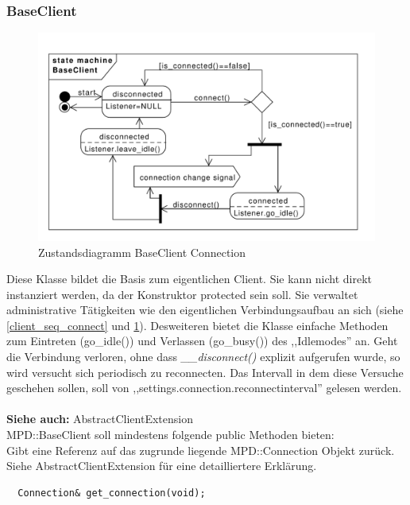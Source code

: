 \subsubsection{BaseClient}

\begin{figure}[htb!]
	\centering
        \includegraphics[width=\textwidth]{./gfx/state/baseclient}
	\caption{Zustandsdiagramm BaseClient Connection}
	\label{st_base_client}
\end{figure}

Diese Klasse bildet die Basis zum eigentlichen Client. Sie kann nicht direkt instanziert werden, da
der Konstruktor protected sein soll.
Sie verwaltet administrative Tätigkeiten wie den eigentlichen Verbindungsaufbau an sich (siehe \ref{client_seq_connect} und \ref{st_base_client}). 
Desweiteren bietet die Klasse einfache Methoden zum Eintreten (go\_idle()) und Verlassen (go\_busy()) des ,,Idlemodes'' an.
Geht die Verbindung verloren, ohne dass \emph{\_\_disconnect()} explizit aufgerufen wurde, so wird versucht sich periodisch zu reconnecten.
Das Intervall in dem diese Versuche geschehen sollen, soll von ,,settings.connection.reconnectinterval'' gelesen werden.
\\
\\
\textbf{Siehe auch:} AbstractClientExtension
\\
MPD::BaseClient soll mindestens folgende public Methoden bieten:
\\
Gibt eine Referenz auf das zugrunde liegende MPD::Connection Objekt zurück. 
Siehe AbstractClientExtension für eine detailliertere Erklärung.
\\
\begin{verbatim}
  Connection& get_connection(void);
\end{verbatim}

